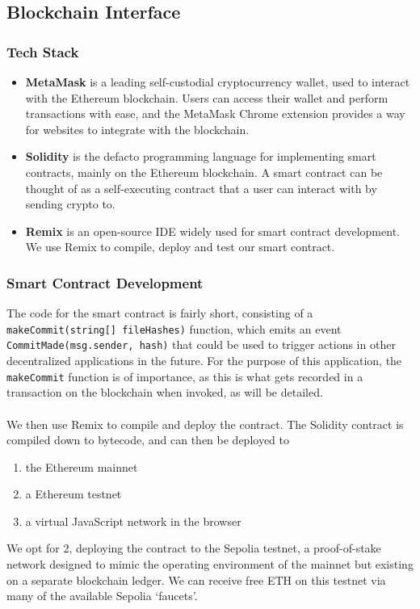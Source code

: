 \documentclass[12pt,a4paper]{article}
\begin{document}
\subsection{Blockchain Interface}
\subsubsection{Tech Stack}
\begin{itemize}
    \item \textbf{MetaMask} is a leading self-custodial cryptocurrency wallet, used to interact with the Ethereum blockchain. Users can access their wallet and perform transactions with ease, and the MetaMask Chrome extension provides a way for websites to integrate with the blockchain.
    \item \textbf{Solidity} is the defacto programming language for implementing smart contracts, mainly on the Ethereum blockchain. A smart contract can be thought of as a self-executing contract that a user can interact with by sending crypto to.
    \item \textbf{Remix} is an open-source IDE widely used for smart contract development. We use Remix to compile, deploy and test our smart contract. 
\end{itemize}
\subsubsection{Smart Contract Development}
The code for the smart contract is fairly short, consisting of a 
\\\verb|makeCommit(string[] fileHashes)| function, which emits an event\\ \verb|CommitMade(msg.sender, hash)| that could be used to trigger actions in other decentralized applications in the future. For the purpose of this application, the \verb|makeCommit| function is of importance, as this is what gets recorded in a transaction on the blockchain when invoked, as will be detailed.\\\\
We then use Remix to compile and deploy the contract. The Solidity contract is compiled down to bytecode, and can then be deployed to
\begin{enumerate}
    \item the Ethereum mainnet
    \item a Ethereum testnet
    \item a virtual JavaScript network in the browser
\end{enumerate}
We opt for 2,  deploying the contract to the Sepolia testnet, a proof-of-stake network designed to mimic the operating environment of the mainnet but existing on a separate blockchain ledger. We can receive free ETH on this testnet via many of the available Sepolia `faucets'.
\end{document}
